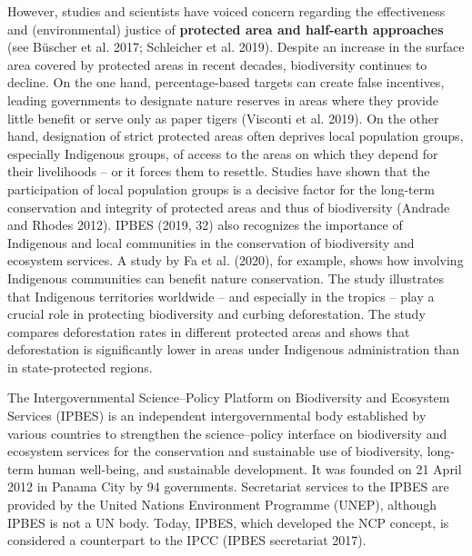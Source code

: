\documentclass[
  a4paper,
  DIV=11,
  numbers=noendperiod,
  oneside,
  openany]{scrreprt}
\begin{document}
However, studies and scientists have voiced concern regarding the
effectiveness and (environmental) justice of \textbf{protected area and
half-earth approaches} (see Büscher et al. 2017; Schleicher et al.
2019). Despite an increase in the surface area covered by protected
areas in recent decades, biodiversity continues to decline. On the one
hand, percentage-based targets can create false incentives, leading
governments to designate nature reserves in areas where they provide
little benefit or serve only as paper tigers (Visconti et al. 2019). On
the other hand, designation of strict protected areas often deprives
local population groups, especially Indigenous groups, of access to the
areas on which they depend for their livelihoods -- or it forces them to
resettle. Studies have shown that the participation of local population
groups is a decisive factor for the long-term conservation and integrity
of protected areas and thus of biodiversity (Andrade and Rhodes 2012).
IPBES (2019, 32) also recognizes the importance of Indigenous and local
communities in the conservation of biodiversity and ecosystem services.
A study by Fa et al. (2020), for example, shows how involving Indigenous
communities can benefit nature conservation. The study illustrates that
Indigenous territories worldwide -- and especially in the tropics --
play a crucial role in protecting biodiversity and curbing
deforestation. The study compares deforestation rates in different
protected areas and shows that deforestation is significantly lower in
areas under Indigenous administration than in state-protected regions.

\begin{tcolorbox}[enhanced jigsaw, arc=.35mm, bottomrule=.15mm, bottomtitle=1mm, breakable, colback=white, colbacktitle=quarto-callout-note-color!10!white, colframe=quarto-callout-note-color-frame, coltitle=black, left=2mm, leftrule=.75mm, opacityback=0, opacitybacktitle=0.6, rightrule=.15mm, title={What is IPBES?}, titlerule=0mm, toprule=.15mm, toptitle=1mm]

The Intergovernmental Science--Policy Platform on Biodiversity and
Ecosystem Services (IPBES) is an independent intergovernmental body
established by various countries to strengthen the science--policy
interface on biodiversity and ecosystem services for the conservation
and sustainable use of biodiversity, long-term human well-being, and
sustainable development. It was founded on 21 April 2012 in Panama City
by 94 governments. Secretariat services to the IPBES are provided by the
United Nations Environment Programme (UNEP), although IPBES is not a UN
body. Today, IPBES, which developed the NCP concept, is considered a
counterpart to the IPCC (IPBES secretariat 2017).

\end{tcolorbox}
\end{document}
